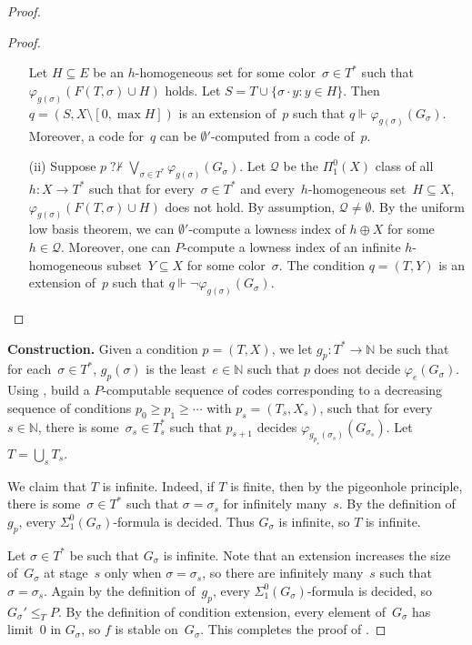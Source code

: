 \documentclass{article}
\def\Q{\mathcal{Q}}
\def\Q{\mathcal{Q}}
\newcommand{\nqvdash}{\operatorname{{?}{\nvdash}}}
\newcommand{\NN}[0]{\mathbb{N}}
\numberwithin{theorem}{section}
\begin{document}
\begin{proof}
\begin{proof}
\begin{itemize}
    Let $H \subseteq E$ be an $h$-homogeneous set for some color~$\sigma \in T^*$ such that $\varphi_{g(\sigma)}(F(T, \sigma) \cup H)$ holds. Let $S = T \cup \{ \sigma \cdot y : y \in H \}$. Then $q = (S, X \setminus [0, \max H])$ is an extension of~$p$ such that $q \Vdash \varphi_{g(\sigma)}(G_\sigma)$. Moreover, a code for~$q$ can be $\emptyset'$-computed from a code of~$p$.
    
    \item[(ii)] Suppose $p \nqvdash \bigvee_{\sigma \in T^*} \varphi_{g(\sigma)}(G_\sigma)$. Let $\Q$ be the $\Pi^0_1(X)$ class of all $h : X \to T^*$ such that for every~$\sigma \in T^*$ and every~$h$-homogeneous set~$H \subseteq X$, $\varphi_{g(\sigma)}(F(T, \sigma) \cup H)$ does not hold. By assumption, $\Q \neq \emptyset$. By the uniform low basis theorem, we can $\emptyset'$-compute a lowness index of $h \oplus X$ for some~$h \in \Q$. Moreover, one can $P$-compute a lowness index of an infinite $h$-homogeneous subset~$Y \subseteq X$ for some color~$\sigma$. The condition $q = (T, Y)$ is an extension of~$p$ such that $q \Vdash \neg \varphi_{g(\sigma)}(G_\sigma)$.
\end{itemize}
\end{proof}
\bigskip

\noindent
\textbf{Construction.}
Given a condition $p = (T, X)$, we let $g_p : T^* \to \NN$ be such that for each~$\sigma \in T^*$, $g_p(\sigma)$ is the least~$e \in \NN$ such that $p$ does not decide $\varphi_e(G_\sigma)$. Using , build a $P$-computable sequence of codes corresponding to a decreasing sequence of conditions $p_0 \geq p_1 \geq \cdots$ with $p_s = (T_s, X_s)$, such that for every~$s \in \NN$, there is some~$\sigma_s \in T_s^*$ such that $p_{s+1}$ decides $\varphi_{g_{p_s}(\sigma_s)}(G_{\sigma_s})$. Let $T  = \bigcup_s T_s$. 

We claim that $T$ is infinite. Indeed, if $T$ is finite, then by the pigeonhole principle, there is some~$\sigma \in T^*$ such that $\sigma = \sigma_s$ for infinitely many~$s$. By the definition of $g_p$, every $\Sigma^0_1(G_\sigma)$-formula is decided.  Thus $G_\sigma$ is infinite, so $T$ is infinite. 

Let $\sigma \in T^*$ be such that $G_\sigma$ is infinite. Note that an extension increases the size of~$G_\sigma$ at stage~$s$ only when $\sigma = \sigma_s$, so there are infinitely many~$s$ such that $\sigma = \sigma_s$. Again by the definition of~$g_p$, every $\Sigma^0_1(G_\sigma)$-formula is decided, so $G_\sigma' \leq_T P$. By the definition of condition extension, every element of~$G_\sigma$ has limit~0 in $G_\sigma$, so $f$ is stable on~$G_\sigma$.
This completes the proof of .
\end{proof}
\end{document}
